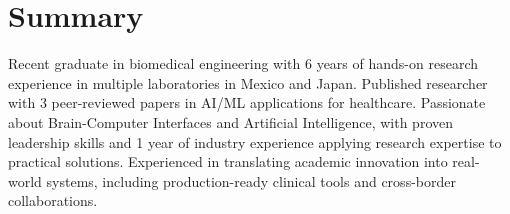 \section*{Summary}

Recent graduate in biomedical engineering with 6 years of hands-on research experience in multiple laboratories in Mexico and Japan. Published researcher with 3 peer-reviewed papers in AI/ML applications for healthcare. Passionate about Brain-Computer Interfaces and Artificial Intelligence, with proven leadership skills and 1 year of industry experience applying research expertise to practical solutions. Experienced in translating academic innovation into real-world systems, including production-ready clinical tools and cross-border collaborations.
